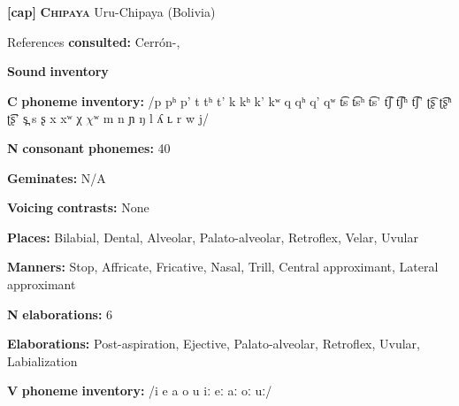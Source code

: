 \begin{styleBody}
\textbf{[cap]}   \textbf{\textsc{Chipaya}}  Uru-Chipaya (Bolivia)
\end{styleBody}

\begin{styleBody}
References \textbf{consulted:} Cerrón-\citet{Palomino2006}, \citet{Olson1967}
\end{styleBody}

\begin{styleBody}
\textbf{Sound} \textbf{inventory}
\end{styleBody}

\begin{styleBody}
\textbf{C} \textbf{phoneme} \textbf{inventory:} /p pʰ p’ t tʰ t’ k kʰ k’ kʷ q qʰ q’ qʷ t͡s t͡sʰ t͡s’ t͡ʃ t͡ʃʰ t͡ʃ’ ʈ͡ʂ ʈ͡ʂʰ ʈ͡ʂ’ s̪ s ʂ x xʷ χ $\chi ʷ$ m n ɲ ŋ l ʎ ʟ r w j/
\end{styleBody}

\begin{styleBody}
\textbf{N} \textbf{consonant} \textbf{phonemes:} 40
\end{styleBody}

\begin{styleBody}
\textbf{Geminates:} N/A
\end{styleBody}

\begin{styleBody}
\textbf{Voicing} \textbf{contrasts:} None
\end{styleBody}

\begin{styleBody}
\textbf{Places:} Bilabial, Dental, Alveolar, Palato-alveolar, Retroflex, Velar, Uvular
\end{styleBody}

\begin{styleBody}
\textbf{Manners:} Stop, Affricate, Fricative, Nasal, Trill, Central approximant, Lateral approximant
\end{styleBody}

\begin{styleBody}
\textbf{N} \textbf{elaborations:} 6
\end{styleBody}

\begin{styleBody}
\textbf{Elaborations:} Post-aspiration, Ejective, Palato-alveolar, Retroflex, Uvular, Labialization
\end{styleBody}

\begin{styleBody}
\textbf{V} \textbf{phoneme} \textbf{inventory:} /i e a o u iː eː aː oː uː/
\end{styleBody}

